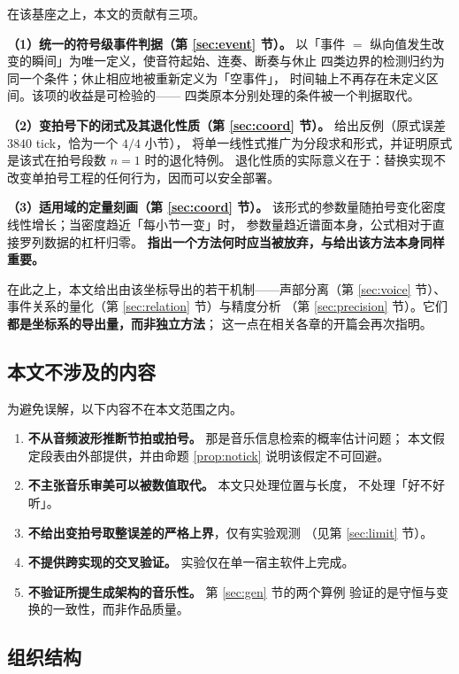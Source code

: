 \documentclass[11pt,a4paper,fontset=none]{ctexart}
\begin{document}
在该基座之上，本文的贡献有三项。

\textbf{（1）统一的符号级事件判据（第 \ref{sec:event} 节）。}
以「事件 $=$ 纵向值发生改变的瞬间」为唯一定义，使音符起始、连奏、断奏与休止
四类边界的检测归约为同一个条件；休止相应地被重新定义为「空事件」，
时间轴上不再存在未定义区间。该项的收益是可检验的——
四类原本分别处理的条件被一个判据取代。

\textbf{（2）变拍号下的闭式及其退化性质（第 \ref{sec:coord} 节）。}
给出反例（原式误差 $3840$ tick，恰为一个 $4/4$ 小节），
将单一线性式推广为分段求和形式，并证明原式是该式在拍号段数 $n=1$ 时的退化特例。
退化性质的实际意义在于：替换实现不改变单拍号工程的任何行为，因而可以安全部署。

\textbf{（3）适用域的定量刻画（第 \ref{sec:coord} 节）。}
该形式的参数量随拍号变化密度线性增长；当密度趋近「每小节一变」时，
参数量趋近谱面本身，公式相对于直接罗列数据的杠杆归零。
\textbf{指出一个方法何时应当被放弃，与给出该方法本身同样重要。}

在此之上，本文给出由该坐标导出的若干机制——声部分离（第 \ref{sec:voice} 节）、
事件关系的量化（第 \ref{sec:relation} 节）与精度分析
（第 \ref{sec:precision} 节）。它们\textbf{都是坐标系的导出量，而非独立方法}；
这一点在相关各章的开篇会再次指明。

\subsection{本文不涉及的内容}

为避免误解，以下内容不在本文范围之内。

\begin{enumerate}[leftmargin=2.2em,itemsep=0.15em,topsep=0.2em]
  \item \textbf{不从音频波形推断节拍或拍号。} 那是音乐信息检索的概率估计问题；
        本文假定段表由外部提供，并由命题 \ref{prop:notick} 说明该假定不可回避。
  \item \textbf{不主张音乐审美可以被数值取代。} 本文只处理位置与长度，
        不处理「好不好听」。
  \item \textbf{不给出变拍号取整误差的严格上界}，仅有实验观测
        （见第 \ref{sec:limit} 节）。
  \item \textbf{不提供跨实现的交叉验证。} 实验仅在单一宿主软件上完成。
  \item \textbf{不验证所提生成架构的音乐性。} 第 \ref{sec:gen} 节的两个算例
        验证的是守恒与变换的一致性，而非作品质量。
\end{enumerate}

\subsection{组织结构}
\end{document}
